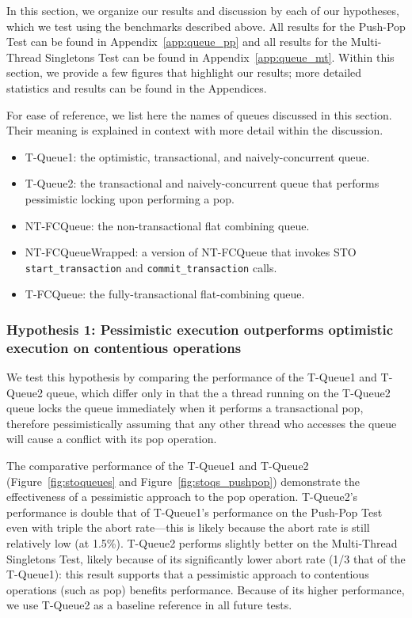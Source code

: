 In this section, we organize our results and discussion by each of our hypotheses, which we test using the benchmarks described above. All results for the Push-Pop Test can be found in Appendix~\ref{app:queue_pp} and all results for the Multi-Thread Singletons Test can be found in Appendix~\ref{app:queue_mt}. Within this section, we provide a few figures that highlight our results; more detailed statistics and results can be found in the Appendices. 

For ease of reference, we list here the names of queues discussed in this section. Their meaning is explained in context with more detail within the discussion.
\begin{itemize}
    \item T-Queue1: the optimistic, transactional, and naively-concurrent queue.
    \item T-Queue2: the transactional and naively-concurrent queue that performs pessimistic locking upon performing a pop.
    \item NT-FCQueue: the non-transactional flat combining queue.
    \item NT-FCQueueWrapped: a version of NT-FCQueue that invokes STO \texttt{start\_transaction} and \texttt{commit\_transaction} calls.
    \item T-FCQueue: the fully-transactional flat-combining queue.
\end{itemize}

\subsubsection{Hypothesis 1: Pessimistic execution outperforms optimistic execution on contentious operations}

We test this hypothesis by comparing the performance of the T-Queue1 and T-Queue2 queue, which differ only in that the a thread running on the T-Queue2 queue locks the queue immediately when it performs a transactional pop, therefore pessimistically assuming that any other thread who accesses the queue will cause a conflict with its pop operation.

The comparative performance of the T-Queue1 and T-Queue2 (Figure~\ref{fig:stoqueues} and Figure~\ref{fig:stoqs_pushpop}) demonstrate the effectiveness of a pessimistic approach to the pop operation. T-Queue2's performance is double that of T-Queue1's performance on the Push-Pop Test even with triple the abort rate---this is likely because the abort rate is still relatively low (at 1.5\%). T-Queue2 performs slightly better on the Multi-Thread Singletons Test, likely because of its significantly lower abort rate (1/3 that of the T-Queue1): this result supports that a pessimistic approach to contentious operations (such as pop) benefits performance. Because of its higher performance, we use T-Queue2 as a baseline reference in all future tests.

